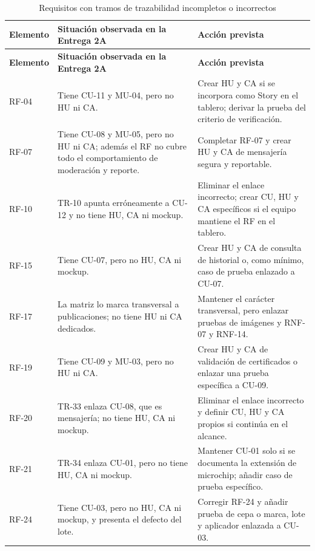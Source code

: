 \documentclass[journal,onecolumn]{IEEEtran}
\begin{document}
	\begin{longtable}{L{2.0cm} L{5.7cm} L{5.8cm}}
		\caption{Requisitos con tramos de trazabilidad incompletos o incorrectos}
		\label{tab:huerfanos}\\
		\toprule
		\textbf{Elemento} & \textbf{Situación observada en la Entrega 2A} &
		\textbf{Acción prevista} \\
		\midrule
		\endfirsthead
		\toprule
		\textbf{Elemento} & \textbf{Situación observada en la Entrega 2A} &
		\textbf{Acción prevista} \\
		\midrule
		\endhead
		\bottomrule
		\endfoot
		RF-04 & Tiene CU-11 y MU-04, pero no HU ni CA. &
		Crear HU y CA si se incorpora como Story en el tablero; derivar la prueba del criterio de
		verificación. \\
		\addlinespace
		RF-07 & Tiene CU-08 y MU-05, pero no HU ni CA; además el RF no cubre todo el comportamiento de
		moderación y reporte. &
		Completar RF-07 y crear HU y CA de mensajería segura y reportable. \\
		\addlinespace
		RF-10 & TR-10 apunta erróneamente a CU-12 y no tiene HU, CA ni mockup. &
		Eliminar el enlace incorrecto; crear CU, HU y CA específicos si el equipo mantiene el RF en el
		tablero. \\
		\addlinespace
		RF-15 & Tiene CU-07, pero no HU, CA ni mockup. &
		Crear HU y CA de consulta de historial o, como mínimo, caso de prueba enlazado a CU-07. \\
		\addlinespace
		RF-17 & La matriz lo marca transversal a publicaciones; no tiene HU ni CA dedicados. &
		Mantener el carácter transversal, pero enlazar pruebas de imágenes y RNF-07 y RNF-14. \\
		\addlinespace
		RF-19 & Tiene CU-09 y MU-03, pero no HU ni CA. &
		Crear HU y CA de validación de certificados o enlazar una prueba específica a CU-09. \\
		\addlinespace
		RF-20 & TR-33 enlaza CU-08, que es mensajería; no tiene HU, CA ni mockup. &
		Eliminar el enlace incorrecto y definir CU, HU y CA propios si continúa en el alcance. \\
		\addlinespace
		RF-21 & TR-34 enlaza CU-01, pero no tiene HU, CA ni mockup. &
		Mantener CU-01 solo si se documenta la extensión de microchip; añadir caso de prueba
		específico. \\
		\addlinespace
		RF-24 & Tiene CU-03, pero no HU, CA ni mockup, y presenta el defecto del lote. &
		Corregir RF-24 y añadir prueba de cepa o marca, lote y aplicador enlazada a CU-03. \\

\end{longtable}
\end{document}
